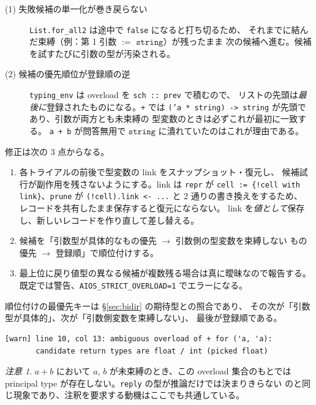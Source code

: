\documentclass[11pt,a4paper]{ltjsarticle}
\theoremstyle{definition}
\theoremstyle{remark}
\newtheorem{remark}{注意}
\newcommand{\ty}[1]{\ensuremath{\mathtt{#1}}}
\begin{document}
\begin{description}
\item[(1) 失敗候補の単一化が巻き戻らない]
  \texttt{List.for\_all2} は途中で \texttt{false} になると打ち切るため、
  それまでに結んだ束縛（例：第 1 引数 $:=$ \ty{string}）が残ったまま
  次の候補へ進む。候補を試すたびに引数の型が汚染される。
\item[(2) 候補の優先順位が登録順の逆]
  \texttt{typing\_env} は overload を \texttt{sch :: prev} で積むので、
  リストの先頭は\emph{最後に}登録されたものになる。\texttt{+} では
  \texttt{('a * string) -> string} が先頭であり、引数が両方とも未束縛の
  型変数のときは必ずこれが最初に一致する。
  \texttt{a + b} が問答無用で \ty{string} に潰れていたのはこれが理由である。
\end{description}

修正は次の 3 点からなる。

\begin{enumerate}
\item 各トライアルの前後で型変数の link をスナップショット・復元し、
  候補試行が副作用を残さないようにする。link は \texttt{repr} が
  \texttt{cell := \{!cell with link\}}、\texttt{prune} が
  \texttt{(!cell).link <- ...} と 2 通りの書き換えをするため、
  レコードを共有したまま保存すると復元にならない。
  link を\emph{値として}保存し、新しいレコードを作り直して差し替える。
\item 候補を「引数型が具体的なもの優先 $\to$ 引数側の型変数を束縛しない
  もの優先 $\to$ 登録順」で順位付けする。
\item 最上位に戻り値型の異なる候補が複数残る場合は真に曖昧なので報告する。
  既定では警告、\texttt{AIOS\_STRICT\_OVERLOAD=1} でエラーになる。
\end{enumerate}

順位付けの最優先キーは \S\ref{sec:bidir} の期待型との照合であり、
その次が「引数型が具体的」、次が「引数側変数を束縛しない」、
最後が登録順である。

\begin{lstlisting}[language={}]
[warn] line 10, col 13: ambiguous overload of + for ('a, 'a):
       candidate return types are float / int (picked float)
\end{lstlisting}

\begin{remark}
$a + b$ において $a$, $b$ が未束縛のとき、この overload 集合のもとでは
principal type が存在しない。\texttt{reply} の型が推論だけでは決まりきらない
のと同じ現象であり、注釈を要求する動機はここでも共通している。
\end{remark}
\end{document}
